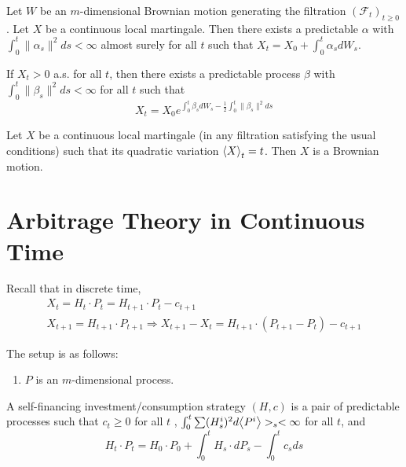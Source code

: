\begin{thm}
  \label{defn:continuous_time:16}
  Let $W$ be an $m$-dimensional Brownian motion generating the
  filtration $(\mathcal{F}_{t})_{t \geq 0}$.
  Let $X$ be a continuous local martingale.  Then there exists a
  predictable $\alpha$ with $\int_{0}^{t} \| \alpha_{s} \|^{2} ds <
  \infty$ almost surely for all $t$ such that $X_{t} = X_{0} +
  \int_{0}^{t} \alpha_{s} dW_{s}$.

  If $X_{t} > 0$ a.s. for all $t$, then there exists a predictable
  process $\beta$ with $\int_{0}^{t} \| \beta_{s} \|^{2} ds < \infty$
  for all $t$ such that
  \begin{equation}
    \label{eq:54}
    X_{t} = X_{0} e^{\int_{0}^{t} \beta_{s} dW_{s} - \frac{1}{2}
      \int_{0}^{t} \| \beta_{s} \|^{2} ds}
  \end{equation}
\end{thm}

\begin{thm}
  \label{defn:continuous_time:17}
  Let $X$ be a continuous local martingale (in any filtration
  satisfying the usual conditions) such that its quadratic variation
  $\IP{ X }_{t} = t$.  Then $X$ is a Brownian motion.
\end{thm}


\section{Arbitrage Theory in Continuous Time}
\label{sec:arbitr-theory-cont}

Recall that in discrete time,
\begin{align}
  \label{eq:55}
  X_{t} = H_{t} \cdot P_{t} = H_{t+1} \cdot P_{t} - c_{t+1} \\
  X_{t+1} = H_{t+1} \cdot P_{t+1} \Rightarrow X_{t+1} - X_{t} =
  H_{t+1} \cdot (P_{t+1} - P_{t}) - c_{t+1}
\end{align}

The setup is as follows:
\begin{enumerate}
\item $P$ is an $m$-dimensional \ito process.
\end{enumerate}

\begin{defn}
  \label{defn:continuous_time:18}
  A self-financing investment/consumption strategy $(H, c)$ is a pair
  of predictable processes such that $c_{t} \geq 0$ for all $t$ ,
  $\int_{0}^{t} \sum (H_{s}^{i})^{2} d \IP{ P^{i} }>_{s} <
  \infty$ for all $t$, and
  \begin{equation}
    \label{eq:56}
    H_{t} \cdot P_{t} = H_{0} \cdot P_{0} + \int_{0}^{t} H_{s} \cdot
    dP_{s} - \int_{0}^{t} c_{s} ds
  \end{equation}
\end{defn}

